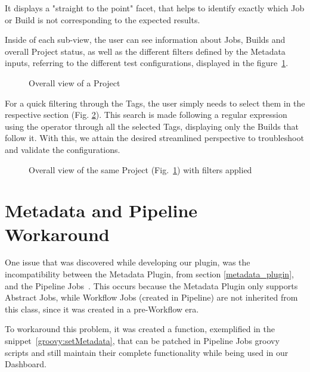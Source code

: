 It displays a "straight to the point" facet, that helps to identify exactly which Job or Build is not corresponding to the expected results.
 
  
Inside of each sub-view, the user can see information about Jobs, Builds and overall Project status, as well as the different filters defined by the Metadata inputs, referring to the different test configurations, displayed in the figure~\ref{dashboardTable1}. 
  
\begin{figure}[H]
  \centering
      \caption{Overall view of a Project}
      \label{dashboardTable1}
  \end{figure}
  
For a quick filtering through the Tags, the user simply needs to select them in the respective section (Fig. \ref{dashboardTable2}). This search is made following a regular expression using the  operator through all the selected Tags, displaying only the Builds that follow it. With this, we attain the desired streamlined perspective to troubleshoot and validate the configurations.
  
\begin{figure}[H]
  \centering
      \caption{Overall view of the same Project (Fig.~\ref{dashboardTable1}) with filters applied}
      \label{dashboardTable2}
  \end{figure}

\section{Metadata and Pipeline Workaround}\label{workaraound}

One issue that was discovered while developing our plugin, was the incompatibility between the Metadata Plugin, from section \ref{metadata_plugin}, and the Pipeline Jobs~\cite{jnks:pipeline}. This occurs because the Metadata Plugin only supports Abstract Jobs, while Workflow Jobs (created in Pipeline) are not inherited from this class, since it was created in a pre-Workflow era.

To workaround this problem, it was created a function, exemplified in the snippet~\ref{groovy:setMetadata}, that can be patched in Pipeline Jobs groovy scripts and still maintain their complete functionality while being used in our Dashboard.

